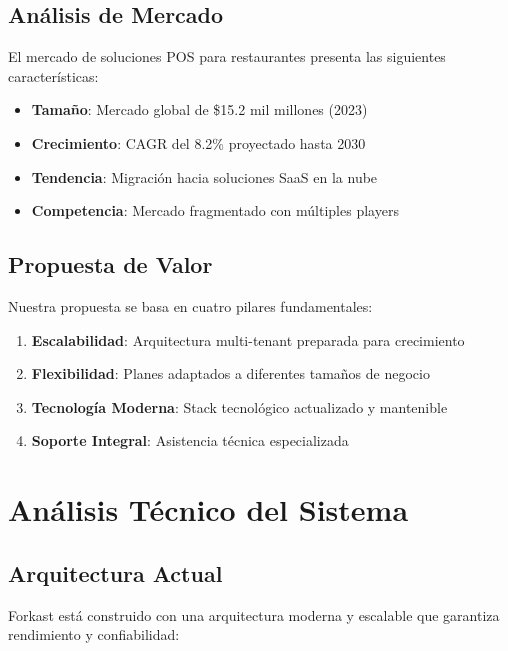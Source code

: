 \documentclass[12pt,a4paper]{article}
\begin{document}
\subsection{Análisis de Mercado}

El mercado de soluciones POS para restaurantes presenta las siguientes características:

\begin{itemize}
    \item \textbf{Tamaño}: Mercado global de \$15.2 mil millones (2023)
    \item \textbf{Crecimiento}: CAGR del 8.2\% proyectado hasta 2030
    \item \textbf{Tendencia}: Migración hacia soluciones SaaS en la nube
    \item \textbf{Competencia}: Mercado fragmentado con múltiples players
\end{itemize}

\subsection{Propuesta de Valor}

Nuestra propuesta se basa en cuatro pilares fundamentales:

\begin{enumerate}
    \item \textbf{Escalabilidad}: Arquitectura multi-tenant preparada para crecimiento
    \item \textbf{Flexibilidad}: Planes adaptados a diferentes tamaños de negocio
    \item \textbf{Tecnología Moderna}: Stack tecnológico actualizado y mantenible
    \item \textbf{Soporte Integral}: Asistencia técnica especializada
\end{enumerate}

\section{Análisis Técnico del Sistema}

\subsection{Arquitectura Actual}

Forkast está construido con una arquitectura moderna y escalable que garantiza rendimiento y confiabilidad:
\end{document}
